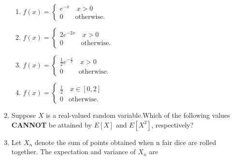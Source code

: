 \documentclass[journal,12pt,twocolumn]{IEEEtran}
\begin{document}
\begin{enumerate}
\begin{enumerate}
\item $ 
f(x)=
\begin{cases}
e^{-x} &  \ x>0\\
0 & \text{otherwise}.
\end{cases}
$\\ 

\item $ 
f(x)=
\begin{cases}
2e^{-2x} & \ x>0\\
0 & \text{otherwise}.
\end{cases}
$\\ 

\item $ 
f(x)=
\begin{cases}
\frac{1}{2}e^{-\frac{x}{2}} &  \ x>0\\
0 & \text{otherwise}.
\end{cases}
$\\ 

\item $ 
f(x)=
\begin{cases}
\frac{1}{2} &  \ x \in [0,2]\\
0 & \text{otherwise}.
\end{cases}
$\\ 



\end{enumerate}


\item Suppose $X$ is a real-valued random variable.Which of the following values \textbf{CANNOT} be attained by $E[X]$ and $E[X^2]$, respectively?


\begin{enumerate}
\end{enumerate}
\solution

\item Let $X_n$ denote the sum of points obtained when n fair dice are rolled together. The expectation and variance of $X_n$ are

\begin{enumerate}
\end{enumerate}
\solution



\end{enumerate}
\end{document}
